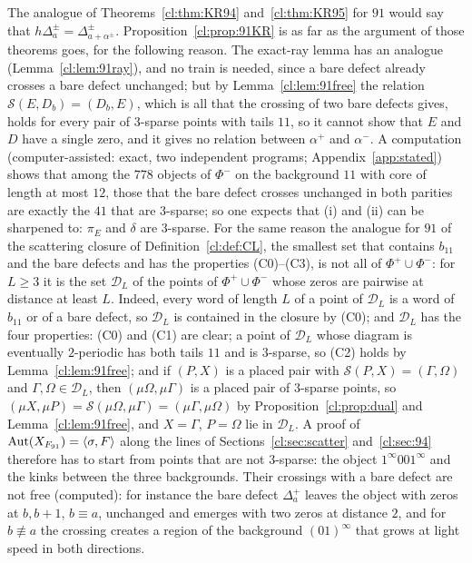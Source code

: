\begin{remark}\label{cl:rem:91}
The analogue of Theorems~\ref{cl:thm:KR94} and~\ref{cl:thm:KR95} for $91$ would say that $h\Delta^\pm_a=\Delta^\pm_{a+\alpha^\pm}$. Proposition~\ref{cl:prop:91KR} is as far as the argument of those theorems goes, for the following reason. The exact-ray lemma has an analogue (Lemma~\ref{cl:lem:91ray}), and no train is needed, since a bare defect already crosses a bare defect unchanged; but by Lemma~\ref{cl:lem:91free} the relation $\mathcal S(E,D_b)=(D_b,E)$, which is all that the crossing of two bare defects gives, holds for every pair of $3$-sparse points with tails $11$, so it cannot show that $E$ and $D$ have a single zero, and it gives no relation between $\alpha^+$ and $\alpha^-$. A computation (computer-assisted: exact, two independent programs; Appendix~\ref{app:stated}) shows that among the $778$ objects of $\Phi^-$ on the background $11$ with core of length at most $12$, those that the bare defect crosses unchanged in both parities are exactly the $41$ that are $3$-sparse; so one expects that (i) and (ii) can be sharpened to: $\pi_E$ and $\delta$ are $3$-sparse. For the same reason the analogue for $91$ of the scattering closure of Definition~\ref{cl:def:CL}, the smallest set that contains $b_{11}$ and the bare defects and has the properties (C0)--(C3), is not all of $\Phi^+\cup\Phi^-$: for $L\ge3$ it is the set $\mathcal D_L$ of the points of $\Phi^+\cup\Phi^-$ whose zeros are pairwise at distance at least $L$. Indeed, every word of length $L$ of a point of $\mathcal D_L$ is a word of $b_{11}$ or of a bare defect, so $\mathcal D_L$ is contained in the closure by (C0); and $\mathcal D_L$ has the four properties: (C0) and (C1) are clear; a point of $\mathcal D_L$ whose diagram is eventually $2$-periodic has both tails $11$ and is $3$-sparse, so (C2) holds by Lemma~\ref{cl:lem:91free}; and if $(P,X)$ is a placed pair with $\mathcal S(P,X)=(\Gamma,\Omega)$ and $\Gamma,\Omega\in\mathcal D_L$, then $(\mu\Omega,\mu\Gamma)$ is a placed pair of $3$-sparse points, so $(\mu X,\mu P)=\mathcal S(\mu\Omega,\mu\Gamma)=(\mu\Gamma,\mu\Omega)$ by Proposition~\ref{cl:prop:dual} and Lemma~\ref{cl:lem:91free}, and $X=\Gamma$, $P=\Omega$ lie in $\mathcal D_L$. A proof of $\operatorname{Aut}(X_{F_{91}})=\langle\sigma,F\rangle$ along the lines of Sections~\ref{cl:sec:scatter} and~\ref{cl:sec:94} therefore has to start from points that are not $3$-sparse: the object $1^\infty001^\infty$ and the kinks between the three backgrounds. Their crossings with a bare defect are not free (computed): for instance the bare defect $\Delta^+_a$ leaves the object with zeros at $b,b+1$, $b\equiv a$, unchanged and emerges with two zeros at distance $2$, and for $b\not\equiv a$ the crossing creates a region of the background $(01)^\infty$ that grows at light speed in both directions.


\end{remark}
